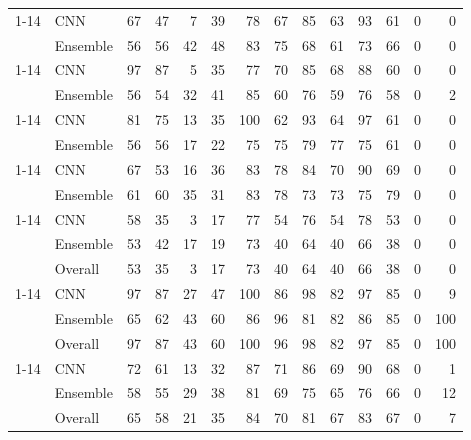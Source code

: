 \begin{tabular}{ll|rr|rr|rr|rr|rr|rr}
\cline{1-14}
\multirow[t]{2}{*}{U12} & CNN & 67 & 47 & 7 & 39 & 78 & 67 & 85 & 63 & 93 & 61 & 0 & 0 \\
 & Ensemble & 56 & 56 & 42 & 48 & 83 & 75 & 68 & 61 & 73 & 66 & 0 & 0 \\
\cline{1-14}
\multirow[t]{2}{*}{U15} & CNN & 97 & 87 & 5 & 35 & 77 & 70 & 85 & 68 & 88 & 60 & 0 & 0 \\
 & Ensemble & 56 & 54 & 32 & 41 & 85 & 60 & 76 & 59 & 76 & 58 & 0 & 2 \\
\cline{1-14}
\multirow[t]{2}{*}{U16} & CNN & 81 & 75 & 13 & 35 & 100 & 62 & 93 & 64 & 97 & 61 & 0 & 0 \\
 & Ensemble & 56 & 56 & 17 & 22 & 75 & 75 & 79 & 77 & 75 & 61 & 0 & 0 \\
\cline{1-14}
\multirow[t]{2}{*}{U17} & CNN & 67 & 53 & 16 & 36 & 83 & 78 & 84 & 70 & 90 & 69 & 0 & 0 \\
 & Ensemble & 61 & 60 & 35 & 31 & 83 & 78 & 73 & 73 & 75 & 79 & 0 & 0 \\
\cline{1-14}
\multirow[t]{3}{*}{Min} & CNN & 58 & 35 & 3 & 17 & 77 & 54 & 76 & 54 & 78 & 53 & 0 & 0 \\
 & Ensemble & 53 & 42 & 17 & 19 & 73 & 40 & 64 & 40 & 66 & 38 & 0 & 0 \\
 & Overall & 53 & 35 & 3 & 17 & 73 & 40 & 64 & 40 & 66 & 38 & 0 & 0 \\
\cline{1-14}
\multirow[t]{3}{*}{Max} & CNN & 97 & 87 & 27 & 47 & 100 & 86 & 98 & 82 & 97 & 85 & 0 & 9 \\
 & Ensemble & 65 & 62 & 43 & 60 & 86 & 96 & 81 & 82 & 86 & 85 & 0 & 100 \\
 & Overall & 97 & 87 & 43 & 60 & 100 & 96 & 98 & 82 & 97 & 85 & 0 & 100 \\
\cline{1-14}
\multirow[t]{3}{*}{Mean} & CNN & 72 & 61 & 13 & 32 & 87 & 71 & 86 & 69 & 90 & 68 & 0 & 1 \\
 & Ensemble & 58 & 55 & 29 & 38 & 81 & 69 & 75 & 65 & 76 & 66 & 0 & 12 \\
 & Overall & 65 & 58 & 21 & 35 & 84 & 70 & 81 & 67 & 83 & 67 & 0 & 7 \\
\bottomrule
\end{tabular}
